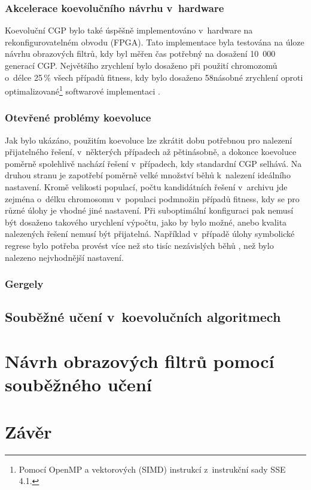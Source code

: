 \subsection{Akcelerace koevolučního návrhu v~hardware}

Koevoluční CGP bylo také úspěšně implementováno v~hardware na rekonfigurovatelném obvodu (FPGA). Tato implementace byla testována na úloze návrhu obrazových filtrů, kdy byl měřen čas potřebný na dosažení 10~000 generací CGP. Největšího zrychlení bylo dosaženo při použití chromozomů o~délce 25\,\% všech případů fitness, kdy bylo dosaženo 58násobné zrychlení oproti optimalizované\footnote{Pomocí OpenMP a vektorových (SIMD) instrukcí z~instrukční sady SSE 4.1.} softwarové implementaci \cite{Hrbacek}.

\subsection{Otevřené problémy koevoluce}

Jak bylo ukázáno, použitím koevoluce lze zkrátit dobu potřebnou pro nalezení přijatelného řešení, v~některých případech až pětinásobně, a dokonce koevoluce poměrně spolehlivě nachází řešení v~případech, kdy standardní CGP selhává. Na druhou stranu je zapotřebí poměrně velké množství běhů k~nalezení ideálního nastavení. Kromě velikosti populací, počtu kandidátních řešení v~archivu jde zejména o~délku chromosomu v~populaci podmnožin případů fitness, kdy se pro různé úlohy je vhodné jiné nastavení. Při suboptimální konfiguraci pak nemusí být dosaženo takového urychlení výpočtu, jako by bylo možné, anebo kvalita nalezených řešení nemusí být přijatelná. Například v~případě úlohy symbolické regrese bylo potřeba provést více než sto tisíc nezávislých běhů \cite{SikuEuroGP}, než bylo nalezeno nejvhodnější nastavení.




\subsection{Gergely}



\section{Souběžné učení v~koevolučních algoritmech}

\Blind

\chapter{Návrh obrazových filtrů pomocí souběžného učení}

\Blind

\chapter{Závěr}

\Blind
